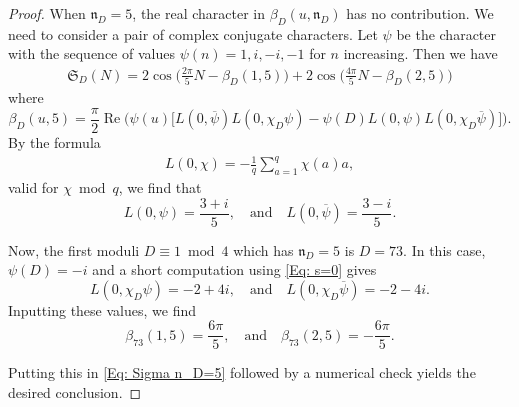 \documentclass[11pt]{amsart}
\numberwithin{equation}{section}
\newcommand{\mf}{\mathfrak}
\newcommand{\n}{\mf{n}_D}
\theoremstyle{remark}
\begin{document}
\begin{proof}
When $\n=5$, the real character in $\beta_D(u,\mf{n}_D)$ has no contribution. We need to consider a pair of complex conjugate characters. Let $\psi$ be the character with the sequence of values $\psi(n)=1,i,-i,-1$ for $n$ increasing. Then we have
\begin{align}\label{Eq: Sigma n_D=5}
\mf{S}_D(N)
=
2\cos\bigg(\frac{2\pi }{5}N-\beta_D(1,5)\bigg)+2\cos\bigg(\frac{4\pi }{5}N-\beta_D(2,5)\bigg)
\end{align}
where 
\[
\beta_D(u,5)=\frac{\pi}{2}\operatorname{Re}\bigg(\psi(u) \Big[
L(0,\overline{\psi})L(0,\chi_D\psi)-\psi(D) L(0,\psi)L(0,\chi_D\overline{\psi})\Big]\bigg).
\]
By the formula 
\begin{align}\label{Eq: s=0}
L(0,\chi)=-\frac{1}{q}\sum_{a=1}^q \chi(a)a,
\end{align}
valid for $\chi \bmod q$, we find that 
\[
L(0,{\psi})=
\frac{3+i}{5}, \quad \textrm{and} \quad L(0,\overline{\psi})=
\frac{3-i}{5}.
\]
\par
Now, the first moduli $D\equiv 1 \bmod 4$ which has $\n=5$ is $D=73$. In this case, $\psi(D)=-i$ and a short computation using \eqref{Eq: s=0} gives 
\[
L(0,\chi_D\psi)
=
-2+4i, \quad \textrm{and} \quad L(0,\chi_D\overline{\psi})
=
-2-4i.
\]
Inputting these values, we find 
\[
\beta_{73}(1,5)=\frac{6\pi}{5},
\quad \textrm{and} \quad
\beta_{73}(2,5)=-\frac{6\pi}{5}.
\]

Putting this in \eqref{Eq: Sigma n_D=5} followed by a numerical check yields the desired conclusion.
\end{proof}
\end{document}
